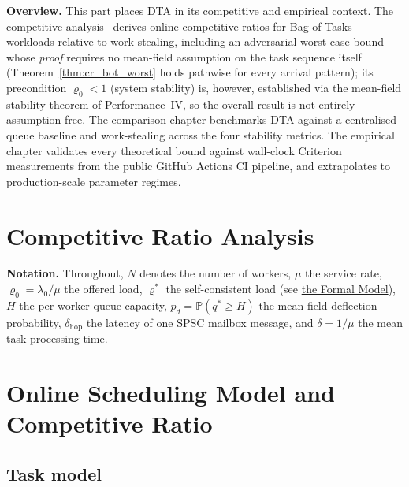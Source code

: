 \documentclass[11pt,a4paper]{article}
\begin{document}
\bigskip
\noindent\textbf{Overview.}
This part places DTA in its competitive and empirical context.
The competitive analysis~\cite{borodin_elyaniv1998,borodin1996} derives online competitive ratios for Bag-of-Tasks
workloads relative to work-stealing, including an adversarial worst-case
bound whose \emph{proof} requires no mean-field assumption on the task
sequence itself (Theorem~\ref{thm:cr_bot_worst} holds pathwise for every
arrival pattern); its precondition $\varrho_0 < 1$ (system stability)
is, however, established via the mean-field stability theorem of
\hyperref[chap:stability]{Performance~IV}, so the overall result is not
entirely assumption-free.
The comparison chapter benchmarks DTA against a centralised queue baseline
and work-stealing across the four stability metrics.
The empirical chapter validates every theoretical bound against
wall-clock Criterion measurements from the public GitHub Actions CI pipeline,
and extrapolates to production-scale parameter regimes.



\section*{Competitive Ratio Analysis}
\label{chap:competitive_ratio}
\setcounter{section}{0}

\textbf{Notation.}
Throughout, $N$ denotes the number of workers, $\mu$ the service rate,
$\varrho_0 = \lambda_0/\mu$ the offered load, $\varrho^*$ the self-consistent
load (see \hyperref[chap:formal_model]{the Formal Model}), $H$ the per-worker queue capacity,
$p_d = \mathbb{P}(q^* \ge H)$ the mean-field deflection probability,
$\delta_{\mathrm{hop}}$ the latency of one SPSC mailbox message, and
$\delta = 1/\mu$ the mean task processing time.

\section{Online Scheduling Model and Competitive Ratio}

\subsection{Task model}
\end{document}
